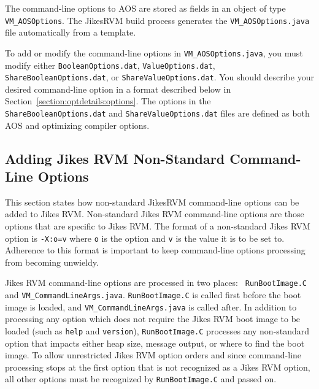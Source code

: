 The command-line options to AOS are
stored as fields in an object of type {\tt VM\_AOSOptions}.
The Jikes\trademark RVM build process generates the {\tt VM\_AOSOptions.java} 
file automatically from a template.  

To add or modify the command-line options in {\tt VM\_AOSOptions.java},
you must modify either {\tt BooleanOptions.dat}, {\tt ValueOptions.dat},
{\tt ShareBooleanOptions.dat}, or {\tt ShareValueOptions.dat}.
You should describe your desired command-line option in a format 
described below in Section~\ref{section:optdetails:options}.
The options in the {\tt ShareBooleanOptions.dat} and {\tt ShareValueOptions.dat}
files are defined as both AOS and optimizing compiler options.

\JikesTMFooter

\subsection{Adding Jikes RVM Non-Standard Command-Line Options}
This section states how non-standard Jikes\trademark RVM command-line options can be added
to Jikes RVM.  
Non-standard Jikes RVM command-line options are those options that are specific
to Jikes RVM.
The format of a non-standard Jikes RVM option is {\tt -X:o=v} where {\tt o} is the 
option and {\tt v} is the value it is to be set to.
Adherence to this format is important to keep command-line options processing
from becoming unwieldy.

Jikes RVM command-line options are processed in two places: {\tt
RunBootImage.C} and 
{\tt VM\_CommandLineArgs.java}.  
{\tt RunBootImage.C} is called first before the boot image is loaded,
and {\tt VM\_CommandLineArgs.java} is called after.
In addition to processing any option which does not require the Jikes
RVM boot image 
to be loaded (such as {\tt help} and {\tt version}), 
{\tt RunBootImage.C} processes any non-standard option that impacts either 
heap size, message output, or where to find the boot image.
To allow unrestricted Jikes RVM option orders and 
since command-line processing stops at the first option that is not 
recognized as a Jikes RVM option, all other options must be recognized by
{\tt RunBootImage.C} and passed on.

\JikesTMFooter